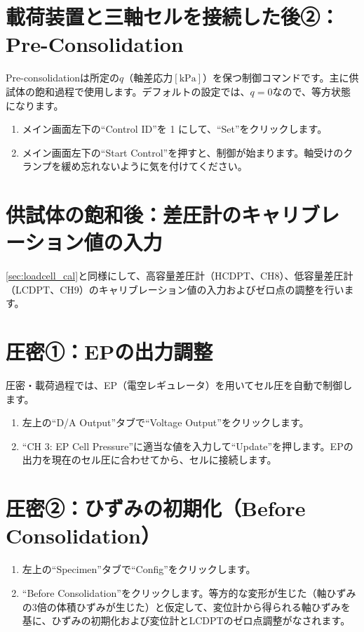 \section{載荷装置と三軸セルを接続した後②：Pre-Consolidation}
Pre-consolidationは所定の$q$（軸差応力$\left[\mathrm{kPa}\right]$）を保つ制御コマンドです。主に供試体の飽和過程で使用します。デフォルトの設定では、$q=0$なので、等方状態になります。
\begin{enumerate}
    \item メイン画面左下の``Control ID''を 1 にして、``Set''をクリックします。
    \item メイン画面左下の``Start Control''を押すと、制御が始まります。軸受けのクランプを緩め忘れないように気を付けてください。
\end{enumerate}

\section{供試体の飽和後：差圧計のキャリブレーション値の入力}
\cref{sec:loadcell_cal}と同様にして、高容量差圧計（HCDPT、CH8）、低容量差圧計（LCDPT、CH9）のキャリブレーション値の入力およびゼロ点の調整を行います。

\section{圧密①：EPの出力調整}
圧密・載荷過程では、EP（電空レギュレータ）を用いてセル圧を自動で制御します。
\begin{enumerate}
    \item 左上の``D/A Output''タブで``Voltage Output''をクリックします。
    \item ``CH 3: EP Cell Pressure''に適当な値を入力して``Update''を押します。EPの出力を現在のセル圧に合わせてから、セルに接続します。
\end{enumerate}

\section{圧密②：ひずみの初期化（Before Consolidation）}
\begin{enumerate}
    \item 左上の``Specimen''タブで``Config''をクリックします。
    \item ``Before Consolidation''をクリックします。等方的な変形が生じた（軸ひずみの3倍の体積ひずみが生じた）と仮定して、変位計から得られる軸ひずみを基に、ひずみの初期化および変位計とLCDPTのゼロ点調整がなされます。
\end{enumerate}

